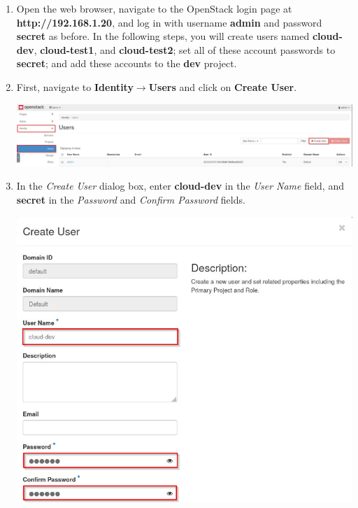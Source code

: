 \documentclass[letterpaper, 12pt]{article}
\begin{document}
\begin{enumerate}
    \item Open the web browser, navigate to the OpenStack login page at \textbf{http://192.168.1.20}, and log in with
    username \textbf{admin} and password \textbf{secret} as before. In the following steps, you will create users named
    \textbf{cloud-dev}, \textbf{cloud-test1}, and \textbf{cloud-test2}; set all of these account passwords to
    \textbf{secret}; and add these accounts to the \textbf{dev} project. 


    \item First, navigate to \textbf{Identity$\rightarrow$Users} and click on \textbf{Create User}.

    \begin{center}
        \includegraphics[width=\linewidth]{images/part3/step2.png}
    \end{center}
    
    \item In the \textit{Create User} dialog box, enter \textbf{cloud-dev} in the \textit{User Name} field, and
    \textbf{secret} in the \textit{Password} and \textit{Confirm Password} fields.

    \begin{center}
        \includegraphics[width=\linewidth]{images/part3/step3.png}
    \end{center}


\end{enumerate}
\end{document}
